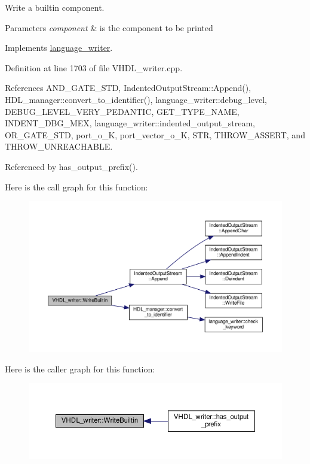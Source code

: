 Write a builtin component. 


\begin{DoxyParams}{Parameters}
{\em component} & is the component to be printed \\
\hline
\end{DoxyParams}


Implements \hyperlink{classlanguage__writer_a30538fe1dc72928281e409f7684ced83}{language\+\_\+writer}.



Definition at line 1703 of file V\+H\+D\+L\+\_\+writer.\+cpp.



References A\+N\+D\+\_\+\+G\+A\+T\+E\+\_\+\+S\+TD, Indented\+Output\+Stream\+::\+Append(), H\+D\+L\+\_\+manager\+::convert\+\_\+to\+\_\+identifier(), language\+\_\+writer\+::debug\+\_\+level, D\+E\+B\+U\+G\+\_\+\+L\+E\+V\+E\+L\+\_\+\+V\+E\+R\+Y\+\_\+\+P\+E\+D\+A\+N\+T\+IC, G\+E\+T\+\_\+\+T\+Y\+P\+E\+\_\+\+N\+A\+ME, I\+N\+D\+E\+N\+T\+\_\+\+D\+B\+G\+\_\+\+M\+EX, language\+\_\+writer\+::indented\+\_\+output\+\_\+stream, O\+R\+\_\+\+G\+A\+T\+E\+\_\+\+S\+TD, port\+\_\+o\+\_\+K, port\+\_\+vector\+\_\+o\+\_\+K, S\+TR, T\+H\+R\+O\+W\+\_\+\+A\+S\+S\+E\+RT, and T\+H\+R\+O\+W\+\_\+\+U\+N\+R\+E\+A\+C\+H\+A\+B\+LE.



Referenced by has\+\_\+output\+\_\+prefix().

Here is the call graph for this function\+:
\nopagebreak
\begin{figure}[H]
\begin{center}
\leavevmode
\includegraphics[width=350pt]{d0/d0c/structVHDL__writer_a1058749b23119ee23449b16921619e04_cgraph}
\end{center}
\end{figure}
Here is the caller graph for this function\+:
\nopagebreak
\begin{figure}[H]
\begin{center}
\leavevmode
\includegraphics[width=350pt]{d0/d0c/structVHDL__writer_a1058749b23119ee23449b16921619e04_icgraph}
\end{center}
\end{figure}


